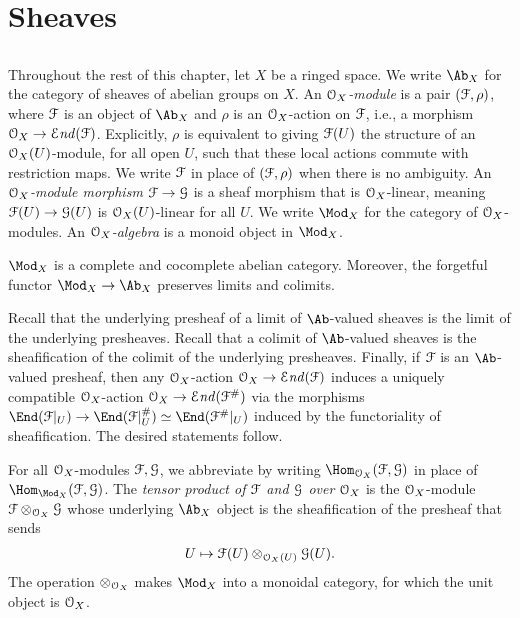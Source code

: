 \documentclass[10pt,final,oneside]{amsbook}
\makeatletter
\renewenvironment{proof}[1][\proofname] 
{ 	
	\par\pushQED{\qed}\normalfont\topsep6\p@\@plus6\p@\relax\trivlist\itemindent\normalparindent
	\item[\hskip\labelsep\itshape#1\@addpunct{.}]\ignorespaces
}
{
	\popQED\endtrivlist\@endpefalse
}
\numberwithin{equation}{section}
\newcommand{\SEnd}{{\mathcal{E}\mathit{nd}}}
\makeatother
\begin{document}
\section{Sheaves}

\subsection{}

Throughout the rest of this chapter, let $X$ be a ringed space.
We write $\Ab_X$ for the category of sheaves of abelian groups on $X$.
An \emph{$\cal{O}_X$-module} is a pair $(\cal{F}, \rho)$, where $\cal{F}$ is an object of $\Ab_X$ and $\rho$ is an $\cal{O}_X$-action on $\cal{F}$, i.e., a morphism $\cal{O}_X \to \SEnd(\cal{F})$.
Explicitly, $\rho$ is equivalent to giving $\cal{F}(U)$ the structure of an $\cal{O}_X(U)$-module, for all open $U$, such that these local actions commute with restriction maps.
We write $\cal{F}$ in place of $(\cal{F}, \rho)$ when there is no ambiguity.
An \emph{$\cal{O}_X$-module morphism $\cal{F} \to \cal{G}$} is a sheaf morphism that is $\cal{O}_X$-linear, meaning $\cal{F}(U) \to \cal{G}(U)$ is $\cal{O}_X(U)$-linear for all $U$.
We write $\Mod_X$ for the category of $\cal{O}_X$-modules.
An \emph{$\cal{O}_X$-algebra} is a monoid object in $\Mod_X$.

\begin{prop}
$\Mod_X$ is a complete and cocomplete abelian category.
Moreover, the forgetful functor $\Mod_X \to \Ab_X$ preserves limits and colimits.
\end{prop}

\begin{proof}
Recall that the underlying presheaf of a limit of $\Ab$-valued sheaves is the limit of the underlying presheaves.
Recall that a colimit of $\Ab$-valued sheaves is the sheafification of the colimit of the underlying presheaves.
Finally, if $\cal{F}$ is an $\Ab$-valued presheaf, then any $\cal{O}_X$-action $\cal{O}_X \to \SEnd(\cal{F})$ induces a uniquely compatible $\cal{O}_X$-action $\cal{O}_X \to \SEnd(\cal{F}^\#)$ via the morphisms $\End(\cal{F}|_U) \to \End(\cal{F}|_U^\#) \simeq \End(\cal{F}^\#|_U)$ induced by the functoriality of sheafification.
The desired statements follow.
\end{proof}

For all $\cal{O}_X$-modules $\cal{F}, \cal{G}$, we abbreviate by writing $\Hom_{\cal{O}_X}(\cal{F}, \cal{G})$ in place of $\Hom_{\Mod_X}(\cal{F}, \cal{G})$.
The \emph{tensor product of $\cal{F}$ and $\cal{G}$ over $\cal{O}_X$} is the $\cal{O}_X$-module $\cal{F} \otimes_{\cal{O}_X} \cal{G}$ whose underlying $\Ab_X$ object is the sheafification of the presheaf that sends 
\begin{align}
U \mapsto \cal{F}(U) \otimes_{\cal{O}_X(U)} \cal{G}(U).
\end{align}
The operation $\otimes_{\cal{O}_X}$ makes $\Mod_X$ into a monoidal category, for which the unit object is $\cal{O}_X$.
\end{document}
